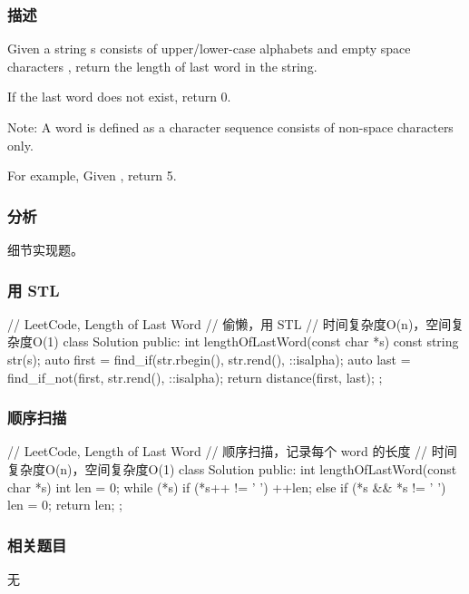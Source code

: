 \subsubsection{描述}
Given a string s consists of upper/lower-case alphabets and empty space characters , return the length of last word in the string.

If the last word does not exist, return 0.

Note: A word is defined as a character sequence consists of non-space characters only.

For example, 
Given ,
return 5.


\subsubsection{分析}
细节实现题。


\subsubsection{用 STL}
\begin{Code}
// LeetCode, Length of Last Word
// 偷懒，用 STL
// 时间复杂度O(n)，空间复杂度O(1)
class Solution {
public:
    int lengthOfLastWord(const char *s) {
        const string str(s);
        auto first = find_if(str.rbegin(), str.rend(), ::isalpha);
        auto last = find_if_not(first, str.rend(), ::isalpha);
        return distance(first, last);
    }
};
\end{Code}


\subsubsection{顺序扫描}
\begin{Code}
// LeetCode, Length of Last Word
// 顺序扫描，记录每个 word 的长度
// 时间复杂度O(n)，空间复杂度O(1)
class Solution {
public:
    int lengthOfLastWord(const char *s) {
        int len = 0;
        while (*s) {
            if (*s++ != ' ')
                ++len;
            else if (*s && *s != ' ')
                len = 0;
        }
        return len;
    }
};
\end{Code}


\subsubsection{相关题目}
\begindot
\item 无
\myenddot
